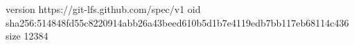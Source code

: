 version https://git-lfs.github.com/spec/v1
oid sha256:514848fd55c8220914abb26a43beed610b5d1b7e4119edb7bb117eb68114c436
size 12384
